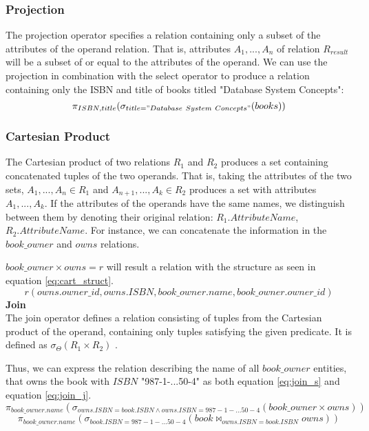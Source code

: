 \subsubsection*{Projection}
The projection operator specifies a relation containing only a subset of the attributes of the operand relation\cite{DBSBook}.
That is, attributes $A_1, ..., A_n$ of relation $R_{result}$ will be a subset of or equal to the attributes of the operand.
We can use the projection in combination with the select operator to produce a relation containing only the ISBN and title of books titled "Database System Concepts":
$$\pi_{ISBN,title} (\sigma_{title = "Database\ System\ Concepts"}(books))$$
\subsubsection*{Cartesian Product}
The Cartesian product of two relations $R_1$ and $R_2$ produces a set containing concatenated tuples of the two operands\cite{DBSBook}.
That is, taking the attributes of the two sets, $A_1,...,A_n \in R_1$ and $A_{n+1},...,A_k \in R_2$ produces a set with attributes $A_1,...,A_k$.
If the attributes of the operands have the same names, we distinguish between them by denoting their original relation: $R_1.AttributeName$, $R_2.AttributeName$. \cite{DBSBook}
For instance, we can concatenate the information in the $book\_owner$ and $owns$ relations.

$book\_owner \times owns = r$ will result a relation with the structure as seen in equation \ref{eq:cart_struct}.
\begin{equation}\label{eq:cart_struct}
    r(owns.owner\_id, owns.ISBN,book\_owner.name,book\_owner.owner\_id)
\end{equation}
\textbf{Join}\\
The join operator defines a relation consisting of tuples from the Cartesian product of the operand, containing only tuples satisfying the given predicate\cite{DBSBook}.
It is defined as $\sigma_{\Theta} (R_1 \times R_2)$ \cite{DBSBook}.

Thus, we can express the relation describing the name of all $book\_owner$ entities, that owns the book with $ISBN$ "987-1-...50-4" as both equation \ref{eq:join_s} and equation \ref{eq:join_j}.
\begin{equation}\label{eq:join_s}
    \pi_{book\_owner.name} (\sigma_{owns.ISBN = book.ISBN \wedge owns.ISBN = 987-1-...50-4}  (book\_owner \times owns))
\end{equation}
\begin{equation}\label{eq:join_j}
    \pi_{book\_owner.name} (\sigma_{book.ISBN = 987-1-...50-4} (book \Join_{owns.ISBN = book.ISBN} owns))
\end{equation}\\


